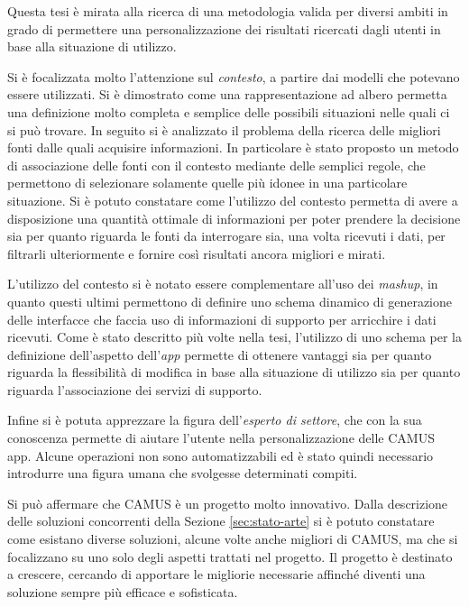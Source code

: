 Questa tesi è mirata alla ricerca di una metodologia valida per diversi ambiti in grado di permettere una personalizzazione dei risultati ricercati dagli utenti in base alla situazione di utilizzo.

Si è focalizzata molto l'attenzione sul \emph{contesto}, a partire dai modelli che potevano essere utilizzati. Si è dimostrato come una rappresentazione ad albero permetta una definizione molto completa e semplice delle possibili situazioni nelle quali ci si può trovare. In seguito si è analizzato il problema della ricerca delle migliori fonti dalle quali acquisire informazioni. In particolare è stato proposto un metodo di associazione delle fonti con il contesto mediante delle semplici regole, che permettono di selezionare solamente quelle più idonee in una particolare situazione. Si è potuto constatare come l'utilizzo del contesto permetta di avere a disposizione una quantità ottimale di informazioni per poter prendere la decisione sia per quanto riguarda le fonti da interrogare sia, una volta ricevuti i dati, per filtrarli ulteriormente e fornire così risultati ancora migliori e mirati.

L'utilizzo del contesto si è notato essere complementare all'uso dei \emph{mashup}, in quanto questi ultimi permettono di definire uno schema dinamico di generazione delle interfacce che faccia uso di informazioni di supporto per arricchire i dati ricevuti. Come è stato descritto più volte nella tesi, l'utilizzo di uno schema per la definizione dell'aspetto dell'\emph{app} permette di ottenere vantaggi sia per quanto riguarda la flessibilità di modifica in base alla situazione di utilizzo sia per quanto riguarda l'associazione dei servizi di supporto.

Infine si è potuta apprezzare la figura dell'\emph{esperto di settore}, che con la sua conoscenza permette di aiutare l'utente nella personalizzazione delle CAMUS app. Alcune operazioni non sono automatizzabili ed è stato quindi necessario introdurre una figura umana che svolgesse determinati compiti.

Si può affermare che CAMUS è un progetto molto innovativo. Dalla descrizione delle soluzioni concorrenti della Sezione \ref{sec:stato-arte} si è potuto constatare come esistano diverse soluzioni, alcune volte anche migliori di CAMUS, ma che si focalizzano su uno solo degli aspetti trattati nel progetto. Il progetto è destinato a crescere, cercando di apportare le migliorie necessarie affinché diventi una soluzione sempre più efficace e sofisticata.

